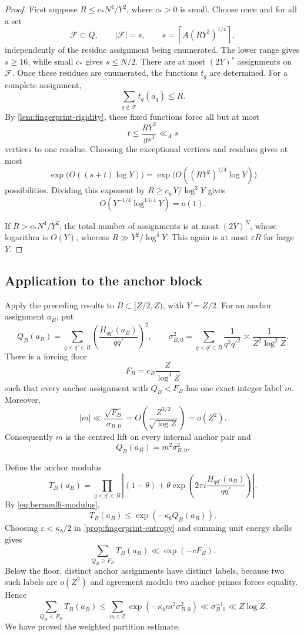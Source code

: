 \begin{proof}
First suppose $R\leq c_*N^4/Y^2$, where $c_*>0$ is small.  Choose once and for all a set
\[
 \mathcal F\subset Q,
 \qquad
 |\mathcal F|=s,
 \qquad
 s=\left\lceil A(RY^2)^{1/4}\right\rceil,
\]
independently of the residue assignment being enumerated.  The lower range gives $s\geq16$, while small $c_*$ gives $s\leq N/2$.  There are at most $(2Y)^s$ assignments on $\mathcal F$.  Once these residues are enumerated, the functions $t_q$ are determined.  For a complete assignment,
\[
 \sum_{q\notin\mathcal F}t_q(a_q)\leq R.
\]
By \cref{lem:fingerprint-rigidity}, these fixed functions force all but at most
\[
 t\leq\frac{RY^2}{gs^3}\ll_A s
\]
vertices to one residue.  Choosing the exceptional vertices and residues gives at most
\[
 \exp\bigl(O((s+t)\log Y)\bigr)
 =\exp\bigl(O((RY^2)^{1/4}\log Y)\bigr)
\]
possibilities.  Dividing this exponent by $R\geq c_wY/\log^3Y$ gives
\[
 O(Y^{-1/4}\log^{13/4}Y)=o(1).
\]

If $R>c_*N^4/Y^2$, the total number of assignments is at most $(2Y)^N$, whose logarithm is $O(Y)$, whereas $R\gg Y^2/\log^4Y$.  This again is at most $\varepsilon R$ for large $Y$.
\end{proof}

\subsection{Application to the anchor block}

Apply the preceding results to $B\subset[Z/2,Z)$, with $Y=Z/2$.  For an anchor assignment $a_B$, put
\[
 Q_B(a_B)=\sum_{q<q'\in B}
 \left(\frac{H_{qq'}(a_B)}{qq'}\right)^2,
 \qquad
 \sigma_{B,0}^2=\sum_{q<q'\in B}\frac1{q^2q'^2}
 \asymp\frac1{Z^2\log^2Z}.
\]
There is a forcing floor
\[
 F_B=c_B\frac{Z}{\log^3Z}
\]
such that every anchor assignment with $Q_B<F_B$ has one exact integer label $m$.  Moreover,
\[
 |m|\ll\frac{\sqrt{F_B}}{\sigma_{B,0}}
 =O\!\left(\frac{Z^{3/2}}{\sqrt{\log Z}}\right)
 =o(Z^2).
\]
Consequently $m$ is the centred lift on every internal anchor pair and
\begin{equation}
\label{eq:top-exact-energy}
 Q_B(a_B)=m^2\sigma_{B,0}^2.
\end{equation}

Define the anchor modulus
\[
 T_B(a_B)=
 \prod_{q<q'\in B}
 \left|(1-\theta)+\theta
 \exp\left(2\pi i\frac{H_{qq'}(a_B)}{qq'}\right)\right|.
\]
By \cref{eq:bernoulli-modulus},
\[
 T_B(a_B)\leq\exp(-\kappa_bQ_B(a_B)).
\]
Choosing $\varepsilon<\kappa_b/2$ in \cref{prop:fingerprint-entropy} and summing unit energy shells gives
\begin{equation}
\label{eq:noncoherent-top-tail}
 \sum_{Q_B\geq F_B}T_B(a_B)
 \ll\exp(-cF_B).
\end{equation}
Below the floor, distinct anchor assignments have distinct labels, because two such labels are $o(Z^2)$ and agreement modulo two anchor primes forces equality.  Hence
\[
 \sum_{Q_B<F_B}T_B(a_B)
 \leq\sum_{m\in\mathbb Z}
 \exp(-\kappa_bm^2\sigma_{B,0}^2)
 \ll\sigma_{B,0}^{-1}
 \ll Z\log Z.
\]
We have proved the weighted partition estimate.

